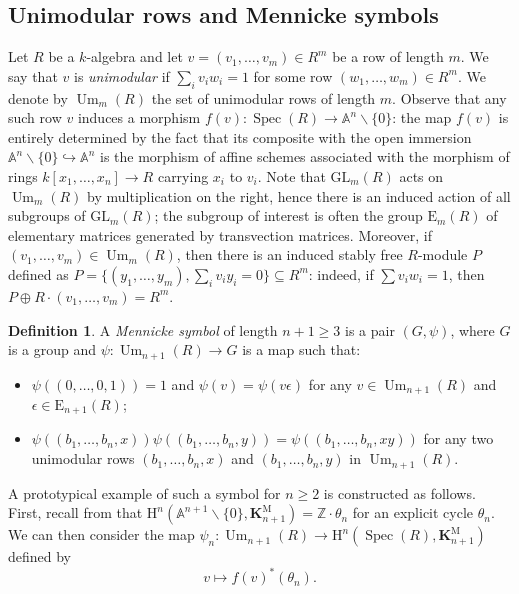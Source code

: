 \documentclass[11pt,leqno]{amsart}
\newcommand{\Spec}{\operatorname{Spec}}
\newcommand{\Z}{{\mathbb Z}}
\newcommand{\A}{{\mathbb A}}
\newcommand{\GL}{{\mathrm{GL}}}
\renewcommand{\1}{{\rm 1\hspace*{-0.4ex}%
\rule{0.1ex}{1.52ex}\hspace*{0.2ex}}}
\newcommand{\K}{{{\mathbf K}}}
\newcommand{\KM}{\K^{\mathrm M}}
\newcommand{\Hr}{{\mathrm {H}}}
\newcommand{\<}[1]{{\langle}#1 {\rangle}}
\newcommand{\Abb}{\mathbb{A}}
\newcommand{\Um}{\operatorname{Um}}
\theoremstyle{plain}
\theoremstyle{definition}
\newtheorem{defn}[thm]{Definition}
\theoremstyle{remark}
\numberwithin{equation}{section}
\begin{document}
\subsection{Unimodular rows and Mennicke symbols}\label{subsection:Um_n}

Let $R$ be a $k$-algebra and let $v=(v_1,\ldots,v_m)\in R^m$ be a row of length $m$. We say that $v$ is \emph{unimodular} if $\sum_i v_iw_i=1$ for some row $(w_1,\ldots,w_m)\in R^m$. We denote by $\Um_{m}(R)$ the set of unimodular rows of length $m$. Observe that any such row $v$ induces a morphism $f(v):\Spec(R)\to\Abb^n\smallsetminus\{0\}$: the map $f(v)$ is entirely determined by the fact that its composite with the open immersion $\Abb^n\smallsetminus\{0\}\hookrightarrow\Abb^n$ is the morphism of affine schemes associated with the morphism of rings $k[x_1,\ldots,x_n]\to R$ carrying $x_i$ to $v_i$. Note that $\GL_m(R)$ acts on $\Um_m(R)$ by multiplication on the right, hence there is an induced action of all subgroups of $\GL_m(R)$; the subgroup of interest is often the group $\mathrm{E}_m(R)$ of elementary matrices generated by transvection matrices. Moreover, if $(v_1,\ldots,v_m)\in\Um_m(R)$, then there is an induced stably free $R$-module $P$ defined as $P=\{(y_1,\ldots,y_m),\sum_i v_iy_i=0\}\subseteq R^m$: indeed, if $\sum v_iw_i=1$, then $P\oplus R\cdot(v_1,\ldots,v_m)=R^m$.

\begin{defn}	\label{weakMennickeSymbol}
A \emph{Mennicke symbol} of length $n + 1 \ge 3$ is a pair $(G,\psi)$,
where $G$ is a group and $\psi : \Um_{n+1}(R) \to G$ is a map such that:
\begin{itemize}
	\item[(1)]  $\psi((0,\ldots,0, 1)) = 1$ and $\psi(v) = \psi(v\epsilon)$ for any $v\in \Um_{n+1}(R)$ and $\epsilon \in \mathrm{E}_{n+1}(R)$;
	\item[(2)] $\psi((b_1,\ldots, b_n, x))\psi((b_1,\ldots,b_n, y)) = \psi((b_1,\ldots,b_n, xy))$ for any two unimodular rows $(b_1,\ldots, b_n, x)$ and $(b_1,\ldots,b_n, y)$ in $\Um_{n+1}(R)$.
\end{itemize}
\end{defn}

A prototypical example of such a symbol for $n\geq 2$ is constructed as follows. First, recall from \cite[\S 3.3]{faselRemarksOrbitSets2010a} that $\Hr^n(\A^{n+1}\smallsetminus \{0\},\KM_{n+1})=\Z\cdot \theta_n$ for an explicit cycle $\theta_n$. We can then consider the map $\psi_n\colon \Um_{n+1}(R)\to \Hr^n(\Spec(R),\KM_{n+1})$ defined by
\[
v\mapsto f(v)^*(\theta_n).
\]
\end{document}
